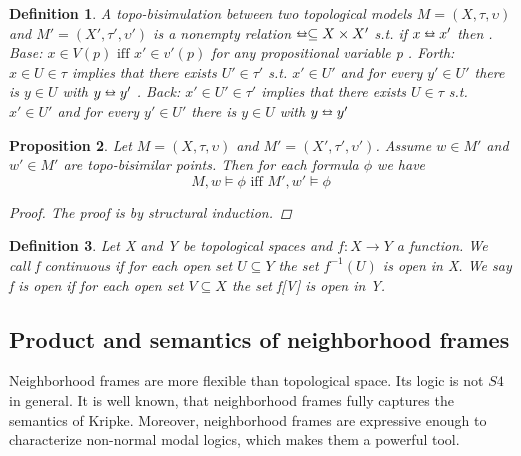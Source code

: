 \documentclass[12pt, a4paper]{scrartcl}
\newtheorem{definition}{Definition}[subsection]
\newtheorem{proposition}[definition]{Proposition}
\begin{document}
\begin{definition}
    A topo-bisimulation between two topological models $M = (X,\tau, \upsilon)$ and $M' = (X', \tau', \upsilon')$ is a nonempty relation $\leftrightarroweq \subseteq X \times X'$ s.t. if $x \leftrightarroweq x'$ then \newline 
    . Base: $x \in V(p) \mbox{ iff } x' \in v'(p)$ for any propositional variable p . Forth: $x \in U \in \tau$ implies that there exists $U' \in \tau'$ s.t. $x' \in U'$ and for every $y' \in U'$ there is $y \in U$ with $y \leftrightarroweq y'$ . Back: $x' \in U' \in \tau'$ implies that there exists $U \in \tau$ s.t. $x' \in U'$ and for every $y' \in U'$ there is $y \in U$ with $y \leftrightarroweq y'$

\end{definition}

\begin{proposition}
    Let $M = (X,\tau, \upsilon)$ and $M' = (X', \tau', \upsilon')$. Assume $w \in M'$ and $w' \in M'$ are topo-bisimilar points.
    Then for each formula $\phi$ we have 
    $$M,w \vDash \phi \mbox{ iff } M', w' \vDash \phi$$
    \begin{proof}
            The proof is by structural induction.
    \end{proof}

\end{proposition}


\begin{definition}
    Let X and Y be topological spaces and $f : X \rightarrow Y$ a function.
    We call f continuous if for each open set $U \subseteq Y$ the set $f^{-1}(U)$ is open in X. We say f 
    is open if for each open set $V \subseteq X$ the set f[V] is open in Y.
        
\end{definition}

\subsection{Product and semantics of neighborhood frames}
Neighborhood frames are more flexible than topological space. Its logic is not $S4$ in general. 
It is well known, that neighborhood frames fully captures the semantics of Kripke. Moreover, neighborhood frames are expressive enough to characterize non-normal modal logics, which makes them a powerful tool.
\end{document}
